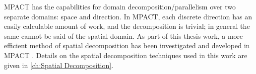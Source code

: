 {{        MPACT has the capabilities for domain decomposition/parallelism over two separate domains: space and direction.
        In MPACT, each discrete direction has an easily calculable amount of work, and the decomposition is trivial; in general the same cannot be said of the spatial domain.
        As part of this thesis work, a more efficient method of spatial decomposition has been investigated and developed in MPACT \cite{Fitzgerald2019a}.
        Details on the spatial decomposition techniques used in this work are given in \cref{ch:Spatial Decomposition}.
    }

    \printbibliography
}